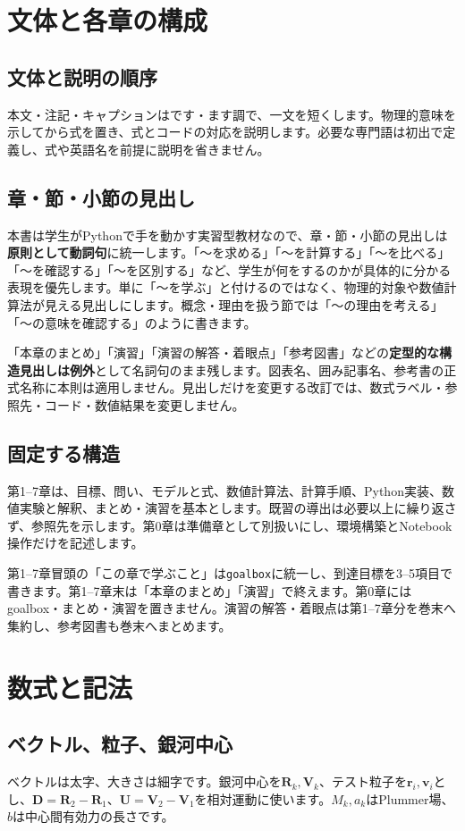 \documentclass[10pt,openany]{book}
\begin{document}
\section{文体と各章の構成}
\subsection{文体と説明の順序}
本文・注記・キャプションはです・ます調で、一文を短くします。物理的意味を示してから式を置き、式とコードの対応を説明します。必要な専門語は初出で定義し、式や英語名を前提に説明を省きません。
\subsection{章・節・小節の見出し}
本書は学生がPythonで手を動かす実習型教材なので、章・節・小節の見出しは\textbf{原則として動詞句}に統一します。「〜を求める」「〜を計算する」「〜を比べる」「〜を確認する」「〜を区別する」など、学生が何をするのかが具体的に分かる表現を優先します。単に「〜を学ぶ」と付けるのではなく、物理的対象や数値計算法が見える見出しにします。概念・理由を扱う節では「〜の理由を考える」「〜の意味を確認する」のように書きます。

「本章のまとめ」「演習」「演習の解答・着眼点」「参考図書」などの\textbf{定型的な構造見出しは例外}として名詞句のまま残します。図表名、囲み記事名、参考書の正式名称に本則は適用しません。見出しだけを変更する改訂では、数式ラベル・参照先・コード・数値結果を変更しません。

\subsection{固定する構造}
第1--7章は、目標、問い、モデルと式、数値計算法、計算手順、Python実装、数値実験と解釈、まとめ・演習を基本とします。既習の導出は必要以上に繰り返さず、参照先を示します。第0章は準備章として別扱いにし、環境構築とNotebook操作だけを記述します。

第1--7章冒頭の「この章で学ぶこと」は\texttt{goalbox}に統一し、到達目標を3--5項目で書きます。第1--7章末は「本章のまとめ」「演習」で終えます。第0章にはgoalbox・まとめ・演習を置きません。演習の解答・着眼点は第1--7章分を巻末へ集約し、参考図書も巻末へまとめます。


\section{数式と記法}
\subsection{ベクトル、粒子、銀河中心}
ベクトルは太字、大きさは細字です。銀河中心を$\boldsymbol R_k,\boldsymbol V_k$、テスト粒子を$\boldsymbol r_i,\boldsymbol v_i$とし、$\boldsymbol D=\boldsymbol R_2-\boldsymbol R_1$、$\boldsymbol U=\boldsymbol V_2-\boldsymbol V_1$を相対運動に使います。$M_k,a_k$はPlummer場、$b$は中心間有効力の長さです。
\end{document}
